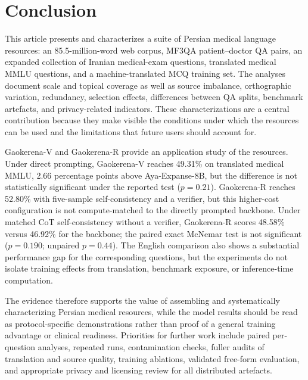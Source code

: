 \documentclass[manuscript,screen,review]{acmart}
\begin{document}
\section{Conclusion}\label{sec:conclusion}

This article presents and characterizes a suite of Persian medical language resources: an 85.5-million-word web corpus, MF3QA patient--doctor QA pairs, an expanded collection of Iranian medical-exam questions, translated medical MMLU questions, and a machine-translated MCQ training set. The analyses document scale and topical coverage as well as source imbalance, orthographic variation, redundancy, selection effects, differences between QA splits, benchmark artefacts, and privacy-related indicators. These characterizations are a central contribution because they make visible the conditions under which the resources can be used and the limitations that future users should account for.

Gaokerena-V and Gaokerena-R provide an application study of the resources. Under direct prompting, Gaokerena-V reaches 49.31\% on translated medical MMLU, 2.66 percentage points above Aya-Expanse-8B, but the difference is not statistically significant under the reported test ($p=0.21$). Gaokerena-R reaches 52.80\% with five-sample self-consistency and a verifier, but this higher-cost configuration is not compute-matched to the directly prompted backbone. Under matched CoT self-consistency without a verifier, Gaokerena-R scores 48.58\% versus 46.92\% for the backbone; the paired exact McNemar test is not significant ($p=0.190$; unpaired $p=0.44$). The English comparison also shows a substantial performance gap for the corresponding questions, but the experiments do not isolate training effects from translation, benchmark exposure, or inference-time computation.

The evidence therefore supports the value of assembling and systematically characterizing Persian medical resources, while the model results should be read as protocol-specific demonstrations rather than proof of a general training advantage or clinical readiness. Priorities for further work include paired per-question analyses, repeated runs, contamination checks, fuller audits of translation and source quality, training ablations, validated free-form evaluation, and appropriate privacy and licensing review for all distributed artefacts.

\end{document}
